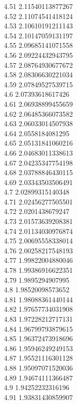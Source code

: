 {4.51	2.11540113877267\\
4.52	2.11074541418124\\
4.53	2.10610191211143\\
4.54	2.10147059131197\\
4.55	2.09685141071558\\
4.56	2.09224432943795\\
4.57	2.08764930677672\\
4.58	2.08306630221034\\
4.59	2.07849527539715\\
4.6	2.07393618617426\\
4.61	2.06938899455659\\
4.62	2.06485366073582\\
4.63	2.06033014507938\\
4.64	2.0558184081295\\
4.65	2.05131841060216\\
4.66	2.04683011338613\\
4.67	2.04235347754198\\
4.68	2.03788846430115\\
4.69	2.03343503506491\\
4.7	2.02899315140348\\
4.71	2.02456277505501\\
4.72	2.0201438679247\\
4.73	2.01573639208381\\
4.74	2.01134030976874\\
4.75	2.00695558338014\\
4.76	2.00258217548193\\
4.77	1.99822004880046\\
4.78	1.99386916622351\\
4.79	1.9895294907995\\
4.8	1.98520098573652\\
4.81	1.98088361440144\\
4.82	1.97657734031908\\
4.83	1.97228212717131\\
4.84	1.96799793879615\\
4.85	1.96372473918696\\
4.86	1.95946249249153\\
4.87	1.95521116301128\\
4.88	1.95097071520036\\
4.89	1.94674111366487\\
4.9	1.94252232316196\\
4.91	1.93831430859907\\
}
